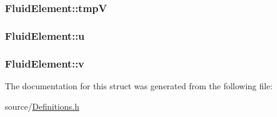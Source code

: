 \subsubsection[{tmp\+V}]{ Fluid\+Element\+::tmp\+V}\label{struct_fluid_element_a46027ac92e12443c175763fc0724a93c}
\hypertarget{struct_fluid_element_a3b438ee50f00308195df193026d81811}{}
\subsubsection[{u}]{ Fluid\+Element\+::u}\label{struct_fluid_element_a3b438ee50f00308195df193026d81811}
\hypertarget{struct_fluid_element_a6a99b2af6aa6cdba2f01ea8802da1749}{}
\subsubsection[{v}]{ Fluid\+Element\+::v}\label{struct_fluid_element_a6a99b2af6aa6cdba2f01ea8802da1749}


The documentation for this struct was generated from the following file\+:\begin{DoxyCompactItemize}
\item 
source/\hyperlink{_definitions_8h}{Definitions.\+h}\end{DoxyCompactItemize}
